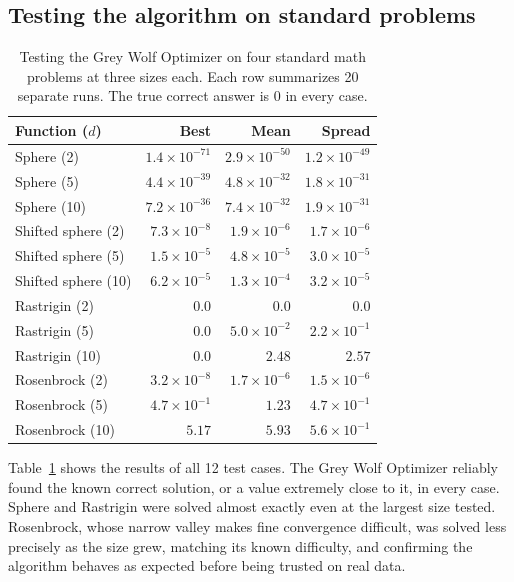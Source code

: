\documentclass[journal]{IEEEtran}
\begin{document}
\subsection{Testing the algorithm on standard problems}
\begin{table}[H]
\caption{Testing the Grey Wolf Optimizer on four standard math
problems at three sizes each. Each row summarizes 20 separate runs. The true correct answer is 0 in every case.}
\label{tab:benchmark}
\small
\begin{tabular}{lrrr}
\toprule
Function ($d$) & Best & Mean & Spread \\
\midrule
Sphere (2) & $1.4{\times}10^{-71}$ & $2.9{\times}10^{-50}$ & $1.2{\times}10^{-49}$ \\
Sphere (5) & $4.4{\times}10^{-39}$ & $4.8{\times}10^{-32}$ & $1.8{\times}10^{-31}$ \\
Sphere (10) & $7.2{\times}10^{-36}$ & $7.4{\times}10^{-32}$ & $1.9{\times}10^{-31}$ \\
Shifted sphere (2) & $7.3{\times}10^{-8}$ & $1.9{\times}10^{-6}$ & $1.7{\times}10^{-6}$ \\
Shifted sphere (5) & $1.5{\times}10^{-5}$ & $4.8{\times}10^{-5}$ & $3.0{\times}10^{-5}$ \\
Shifted sphere (10) & $6.2{\times}10^{-5}$ & $1.3{\times}10^{-4}$ & $3.2{\times}10^{-5}$ \\
Rastrigin (2) & $0.0$ & $0.0$ & $0.0$ \\
Rastrigin (5) & $0.0$ & $5.0{\times}10^{-2}$ & $2.2{\times}10^{-1}$ \\
Rastrigin (10) & $0.0$ & $2.48$ & $2.57$ \\
Rosenbrock (2) & $3.2{\times}10^{-8}$ & $1.7{\times}10^{-6}$ & $1.5{\times}10^{-6}$ \\
Rosenbrock (5) & $4.7{\times}10^{-1}$ & $1.23$ & $4.7{\times}10^{-1}$ \\
Rosenbrock (10) & $5.17$ & $5.93$ & $5.6{\times}10^{-1}$ \\
\bottomrule
\end{tabular}
\end{table}

Table~\ref{tab:benchmark} shows the results of all 12 test cases. The Grey Wolf Optimizer reliably found the known correct solution, or a value extremely close to it, in every case. Sphere and Rastrigin were solved almost exactly even at the largest size tested. Rosenbrock, whose narrow valley makes fine convergence difficult, was solved less precisely as the size grew, matching its known difficulty, and confirming the algorithm behaves as expected before being trusted on real data.
\end{document}
